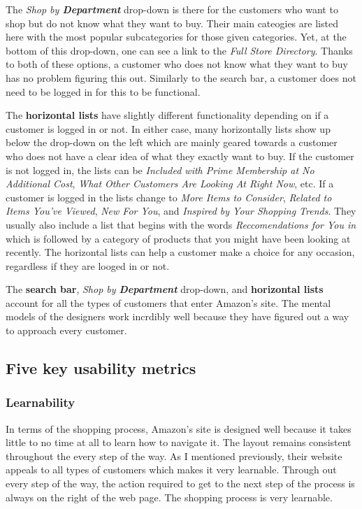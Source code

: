 \documentclass[11pt, oneside]{article}
\begin{document}
The \textit{Shop by \textbf{Department}} drop-down is there for the customers who want to shop but do not know what they want to buy. Their main cateogies are listed here with the most popular subcategories for those given categories. Yet, at the bottom of this drop-down, one can see a link to the \textit{Full Store Directory}. Thanks to both of these options, a customer who does not know what they want to buy has no problem figuring this out. Similarly to the search bar, a customer does not need to be logged in for this to be functional.

The \textbf{horizontal lists} have slightly different functionality depending on if a customer is logged in or not. In either case, many horizontally lists show up below the drop-down on the left which are mainly geared towards a customer who does not have a clear idea of what they exactly want to buy. If the customer is not logged in, the lists can be \textit{Included with Prime Membership at No Additional Cost}, \textit{What Other Customers Are Looking At Right Now}, etc. If a customer is logged in the lists change to \textit{More Items to Consider}, \textit{Related to Items You've Viewed}, \textit{New For You}, and \textit{Inspired by Your Shopping Trends}. They usually also include a list that begins with the words \textit{Reccomendations for You in} which is followed by a category of products that you might have been looking at recently. The horizontal lists can help a customer make a choice for any occasion, regardless if they are looged in or not.

The \textbf{search bar}, \textit{Shop by \textbf{Department}} drop-down, and \textbf{horizontal lists} account for all the types of customers that enter Amazon's site. The mental models of the designers work incrdibly well because they have figured out a way to approach every customer.

\subsection{Five key usability metrics}

\subsubsection{Learnability}
In terms of the shopping process, Amazon's site is designed well because it takes little to no time at all to learn how to navigate it. The layout remains consistent throughout the every step of the way. As I mentioned previously, their website appeals to all types of customers which makes it very learnable. Through out every step of the way, the action required to get to the next step of the process is always on the right of the web page. The shopping process is very learnable.
\end{document}
